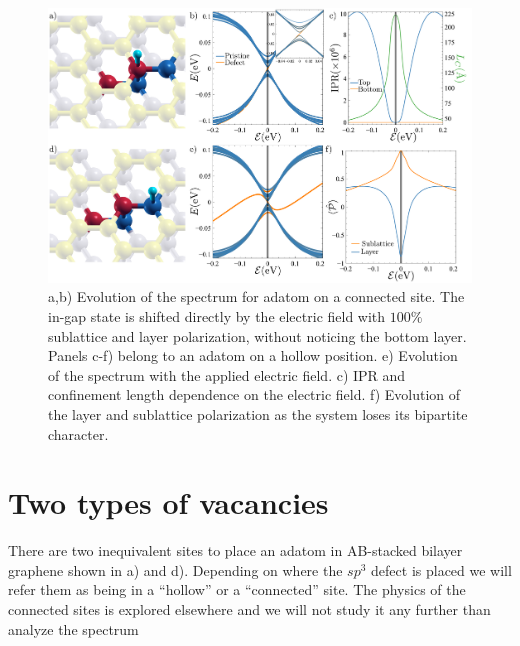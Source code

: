 \begin{figure}[h!]
\centering
\includegraphics{defects/fig/hollow_connected.pdf}
\vspace{-20pt}
\caption{a,b) Evolution of the spectrum for adatom on a connected site. The in-gap state is shifted directly by the electric field with $100\%$ sublattice and layer polarization, without noticing the bottom layer. Panels c-f) belong to an adatom on a hollow position. e) Evolution of the spectrum with the applied electric field. c) IPR and confinement length dependence on the electric field. f) Evolution of the layer and sublattice polarization as the system loses its bipartite character.}
\label{fig:hollow-connected}
\end{figure}



\section{Two types of vacancies}
There are two inequivalent sites to place an adatom in AB-stacked bilayer graphene shown in a) and d). Depending on where the $sp^3$ defect is placed we will refer them as being in a ``hollow'' or a ``connected'' site. The physics of the connected sites is explored elsewhere\cite{Castro2010} and we will not study it any further than analyze the spectrum 


